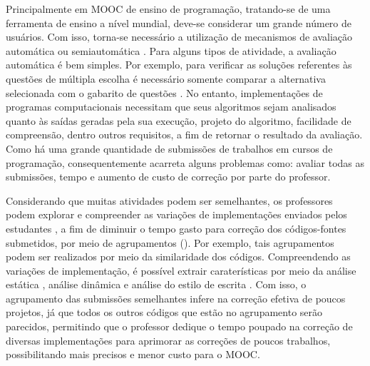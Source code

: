 	Principalmente em \acs{MOOC} de ensino de programação, tratando-se de uma ferramenta de
	ensino a nível mundial, deve-se considerar um grande número de usuários. Com isso,
	torna-se necessário a utilização de mecanismos de avaliação automática ou
	semiautomática \cite{schmidt2013producing}. Para alguns tipos de atividade, a
	avaliação automática é bem simples. Por exemplo, para verificar as soluções
	referentes às questões de múltipla escolha é necessário somente comparar a
	alternativa selecionada com o gabarito de questões \cite{alario2013analysing}. No
	entanto, implementações de programas computacionais necessitam que seus algoritmos
	sejam analisados quanto às saídas geradas pela sua execução, projeto do algoritmo,
	facilidade de compreensão, dentro outros requisitos, a fim de retornar o resultado
	da avaliação. Como há uma grande quantidade de submissões de trabalhos em cursos
	de programação, consequentemente acarreta alguns problemas como: avaliar todas as
	submissões, tempo e aumento de custo de correção por parte do professor.
	
	
	
	Considerando que muitas atividades podem ser semelhantes, os professores podem explorar
	e compreender as variações de implementações enviados pelos estudantes \cite{Yin:2015}, a fim de diminuir
	o tempo gasto para correção dos códigos-fontes submetidos, por meio de agrupamentos
	(). Por exemplo, tais agrupamentos podem ser realizados por meio
	da similaridade dos códigos. Compreendendo as variações de implementação, é possível
	extrair caraterísticas por meio da análise estática \cite{Yin:2015,Glassman:2014,Taherkhani:2012},
	análise dinâmica \cite{Glassman:2015} e análise do estilo de escrita \cite{Wei2015}.
	Com	isso, o agrupamento das submissões semelhantes infere na correção efetiva de
	poucos projetos, já que todos os outros códigos que estão no agrupamento serão
	parecidos, permitindo que o professor dedique o tempo poupado na correção de diversas
	implementações para aprimorar as correções de poucos trabalhos, possibilitando
	 mais precisos e menor custo para o \acs{MOOC}.
	
	
